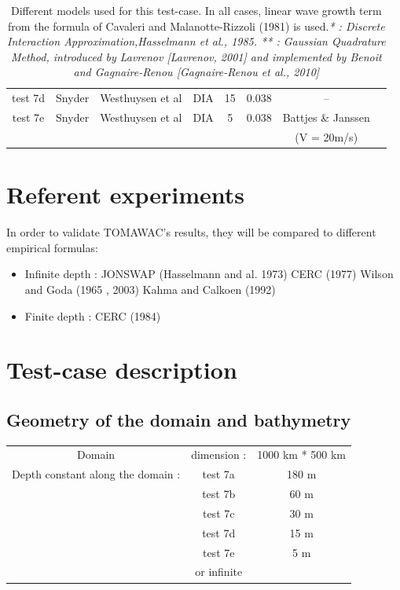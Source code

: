 \documentclass[10pt]{article}
\begin{document}
\begin{table}
\begin{tabular}{|c|c|c|c|c|c|c|c|}
  test 7d & Snyder & Westhuysen et al& DIA & 15 & 0.038& -- \\
   test 7e & Snyder & Westhuysen et al& DIA & 5 & 0.038& Battjes \& Janssen \\
    &  & &  & & &(V = 20m/s) \\ \hline
 \end{tabular}
\caption{Different models used for this test-case. In all cases, linear wave
  growth term from the formula of Cavaleri and
  Malanotte-Rizzoli (1981) is used.\textit{* : Discrete Interaction
    Approximation,Hasselmann et al., 1985. ** : Gaussian Quadrature Method,
    introduced by Lavrenov
    [Lavrenov, 2001] and implemented by Benoit and Gagnaire-Renou
    [Gagnaire-Renou et al., 2010]}}
\end{table}
\section{Referent experiments}
In order to validate TOMAWAC's results, they will be compared to different
empirical formulas:
\begin{itemize}
\item Infinite depth :
\subitem JONSWAP (Hasselmann and al. 1973)
\subitem CERC (1977)
\subitem Wilson and Goda (1965 , 2003)
\subitem Kahma and Calkoen (1992)
\item Finite depth :
\subitem CERC (1984)
\end{itemize}
\section{Test-case description}

\subsection{Geometry of the domain and bathymetry}
\begin{tabular}{ccc}
Domain & dimension :& 1000 km * 500 km\\
 Depth constant along the domain :& test 7a & 180 m\\
 & test 7b & 60 m\\
& test 7c & 30 m\\
& test 7d & 15 m\\
& test 7e & 5 m\\
 & or infinite\\
\end{tabular}
\end{document}
